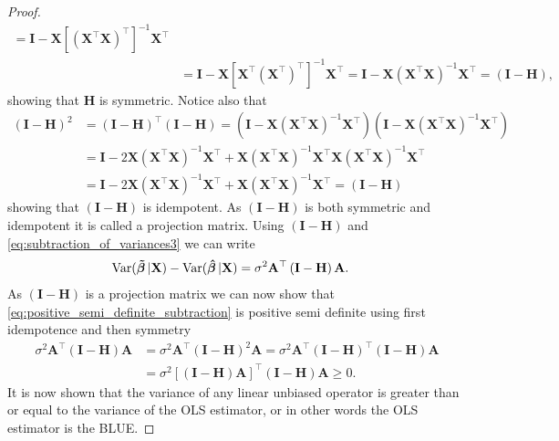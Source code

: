 \begin{proof}
\begin{align*}
        = \mathbf{I} - \mathbf{X}\left[(\mathbf{X}^\top\mathbf{X})^\top\right]^{-1}\mathbf{X}^\top \\
        &= \mathbf{I} - \mathbf{X}\left[\mathbf{X}^\top\left(\mathbf{X}^\top\right)^\top\right]^{-1}\mathbf{X}^\top 
        = \mathbf{I} - \mathbf{X}\left(\mathbf{X}^\top\mathbf{X}\right)^{-1}\mathbf{X}^\top = \left(\mathbf{I} - \mathbf{H}\right),
    \end{align*}
    showing that $\mathbf{H}$ is symmetric.
    Notice also that
    \begin{align*}
        \left(\mathbf{I} - \mathbf{H}\right)^2 &= \left(\mathbf{I} - \mathbf{H}\right)^\top\left(\mathbf{I} - \mathbf{H}\right) = (\mathbf{I} - \mathbf{X}\left(\mathbf{X}^\top\mathbf{X}\right)^{-1}\mathbf{X}^\top)(\mathbf{I} - \mathbf{X}\left(\mathbf{X}^\top\mathbf{X}\right)^{-1}\mathbf{X}^\top) \\
        &= \mathbf{I} - 2\mathbf{X}\left(\mathbf{X}^\top\mathbf{X}\right)^{-1}\mathbf{X}^\top + \mathbf{X}\left(\mathbf{X}^\top\mathbf{X}\right)^{-1}\mathbf{X}^\top\mathbf{X}\left(\mathbf{X}^\top\mathbf{X}\right)^{-1}\mathbf{X}^\top \\
        &= \mathbf{I} - 2\mathbf{X}\left(\mathbf{X}^\top\mathbf{X}\right)^{-1}\mathbf{X}^\top + \mathbf{X}\left(\mathbf{X}^\top\mathbf{X}\right)^{-1}\mathbf{X}^\top = \left(\mathbf{I} - \mathbf{H}\right)
    \end{align*}
    showing that $\left(\mathbf{I} - \mathbf{H}\right)$ is idempotent.
    As $\left(\mathbf{I} - \mathbf{H}\right)$ is both symmetric and idempotent it is called a projection matrix.
    Using $\left(\mathbf{I} - \mathbf{H}\right)$ and \eqref{eq:subtraction_of_variances3} we can write
    \begin{align}\label{eq:positive_semi_definite_subtraction}
        \operatorname{\text{Var}}(\operatorname{\boldsymbol{\Tilde{\beta}}}|\mathbf{X}) - \operatorname{\text{Var}}(\operatorname{\boldsymbol{\hat{\beta}}}|\mathbf{X}) &= \sigma^2\mathbf{A}^\top\left(\mathbf{I} - \mathbf{H}\right)\mathbf{A}.
    \end{align}
    As $\left(\mathbf{I} - \mathbf{H}\right)$ is a projection matrix we can now show that \eqref{eq:positive_semi_definite_subtraction} is positive semi definite using first idempotence and then symmetry
    \begin{align*}
        \sigma^2\mathbf{A}^\top\left(\mathbf{I} - \mathbf{H}\right)\mathbf{A} &= \sigma^2\mathbf{A}^\top\left(\mathbf{I} - \mathbf{H}\right)^2\mathbf{A} = \sigma^2\mathbf{A}^\top\left(\mathbf{I} - \mathbf{H}\right)^\top\left(\mathbf{I} - \mathbf{H}\right)\mathbf{A}\\
        &= \sigma^2\left[\left(\mathbf{I} - \mathbf{H}\right)\mathbf{A}\right]^\top\left(\mathbf{I} - \mathbf{H}\right)\mathbf{A} \geq 0.
    \end{align*}
    It is now shown that the variance of any linear unbiased operator is greater than or equal to the variance of the OLS estimator, or in other words the OLS estimator is the BLUE.
\end{proof}
